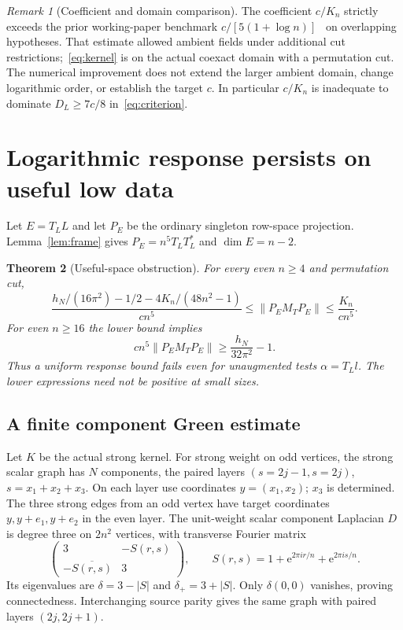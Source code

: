 \documentclass[11pt]{article}
\newcommand{\norm}[1]{\lVert#1\rVert}
\newcommand{\e}{\mathrm e}
\newtheorem{theorem}{Theorem}[section]
\theoremstyle{definition}
\theoremstyle{remark}
\newtheorem{remark}[theorem]{Remark}
\begin{document}
\begin{remark}[Coefficient and domain comparison]\label{rem:comparison}
The coefficient $c/K_n$ strictly exceeds the prior working-paper benchmark
$c/[5(1+\log n)]$~\cite{Eriksson274} on overlapping hypotheses. That estimate allowed
ambient fields under additional cut restrictions;~\eqref{eq:kernel} is on
the actual coexact domain with a permutation cut. The numerical improvement
does not extend the larger ambient domain, change logarithmic order, or
establish the target $c$. In particular $c/K_n$ is inadequate to dominate
$D_L\ge7c/8$ in~\eqref{eq:criterion}.
\end{remark}

\section{Logarithmic response persists on useful low data}\label{sec:useful}
Let $E=T_LL$ and let $P_E$ be the ordinary singleton row-space projection.
Lemma~\ref{lem:frame} gives $P_E=n^5T_LT_L^*$ and $\dim E=n-2$.

\begin{theorem}[Useful-space obstruction]\label{thm:useful}
For every even $n\ge4$ and permutation cut,
\begin{equation}\label{eq:useful}
 \frac{h_N/(16\pi^2)-1/2-4K_n/(48n^2-1)}{cn^5}
 \le\norm{P_EM_TP_E}\le\frac{K_n}{cn^5}.
\end{equation}
For even $n\ge16$ the lower bound implies
\begin{equation}\label{eq:simpleuseful}
        cn^5\norm{P_EM_TP_E}\ge\frac{h_N}{32\pi^2}-1.
\end{equation}
Thus a uniform response bound fails even for unaugmented tests $\alpha=T_Ll$.
The lower expressions need not be positive at small sizes.
\end{theorem}

\subsection{A finite component Green estimate}
Let $K$ be the actual strong kernel. For strong weight on odd vertices,
the strong scalar graph has $N$ components, the paired layers
$(s=2j-1,s=2j)$, $s=x_1+x_2+x_3$. On each layer use coordinates
$y=(x_1,x_2)$; $x_3$ is determined. The three strong edges from an odd
vertex have target coordinates $y,y+e_1,y+e_2$ in the even layer. The
unit-weight scalar component Laplacian $D$ is degree three on $2n^2$
vertices, with transverse Fourier matrix
\[
 \begin{pmatrix}3&-S(r,s)\\-\overline{S(r,s)}&3\end{pmatrix},\qquad
 S(r,s)=1+\e^{2\pi ir/n}+\e^{2\pi is/n}.
\]
Its eigenvalues are $\delta=3-|S|$ and $\delta_+=3+|S|$. Only $\delta(0,0)$
vanishes, proving connectedness. Interchanging source parity gives the
same graph with paired layers $(2j,2j+1)$.
\end{document}
